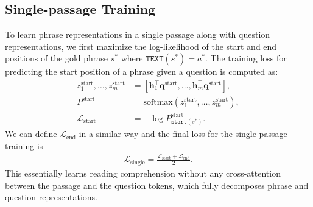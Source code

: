\documentclass[11pt,a4paper]{article}
\newcommand\ttt[1]{\texttt{#1}}
\newcommand\mf[1]{\mathbf{#1}}
\begin{document}
\subsection{Single-passage Training}\label{sec:single-passage}
To learn phrase representations in a single passage along with question representations, we first maximize the log-likelihood of the start and end positions of the gold phrase $s^*$ where $\ttt{TEXT}{(s^*)}=a^*$.
The training loss for predicting the start position of a phrase given a question is computed as:
\begin{equation}\label{eqn:pstart}
\begin{split}
z_1^\text{start}, \dots, z_m^\text{start} &=  [\mf{h}_1^{\top}\mf{q}^\text{start}, \dots, \mf{h}_m^{\top}\mf{q}^\text{start}], \\
    P^\text{start} &= \textrm{softmax}(z_1^\text{start}, \dots, z_m^\text{start}), \\
    \mathcal{L}_\text{start} &=  -\log P^\text{start}_{\ttt{start}(s^*)}.
\end{split}
\end{equation}
We can define $\mathcal{L}_\text{end}$ in a similar way and the final loss for the single-passage training is
\begin{equation}\label{eqn:lsingle}
\begin{split}
\mathcal{L}_\text{single} = \frac{\mathcal{L}_\text{start} + \mathcal{L}_\text{end}}{2}.
\end{split}
\end{equation}
This essentially learns reading comprehension without any cross-attention between the passage and the question tokens, which fully decomposes phrase and question representations.

\begin{comment}
\begin{equation}
    \mathcal{L}_\text{single} = \frac{\mathcal{L}_\text{start} + \mathcal{L}_\text{end}}{2}.
\end{equation}

\paragraph{Differences from DenSPI}
We deviate from DenSPI in the following ways: (1) Previous models split a hidden vector from a pre-trained LM into four vectors (start \& end vectors and two vectors for calculating a coherency score).
We don't do any splitting of vectors and remove the use of coherency scalars.
We find that it is beneficial to keep the output dimension of pre-trained LMs for fully utilizing their representational capacity;
(2) Previous models use a shared encoder for phrases and questions.
However, we use two different language models for representing questions. (3) We use SpanBERT instead of BERT. See Table~\ref{tab:piqa-ablation} for an ablation study.
\end{comment}
\end{document}
